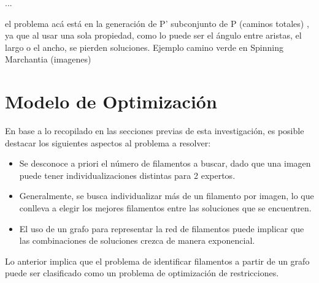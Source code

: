 ...


el problema acá está en la generación de P' subconjunto de P (caminos totales) , ya que al usar una sola propiedad, como lo puede ser el ángulo entre aristas, el largo o el ancho, se pierden soluciones. Ejemplo camino verde en Spinning Marchantia (imagenes)





\section{Modelo de Optimización}

En base a lo recopilado en las secciones previas de esta investigaci\'on, es posible destacar los siguientes aspectos al problema a resolver:

\begin{itemize}
    \item Se desconoce a priori el n\'umero de filamentos a buscar, dado que una imagen puede tener individualizaciones distintas para 2 expertos.
    \item Generalmente, se busca individualizar m\'as de un filamento por imagen, lo que conlleva a elegir los mejores filamentos entre las soluciones que se encuentren.
    \item El uso de un grafo para representar la red de filamentos puede implicar que las combinaciones de soluciones crezca de manera exponencial.
\end{itemize}

Lo anterior implica que el problema de identificar filamentos a partir de un grafo puede ser clasificado como un problema de optimizaci\'on de restricciones\cite{blum2011hybrid}.

